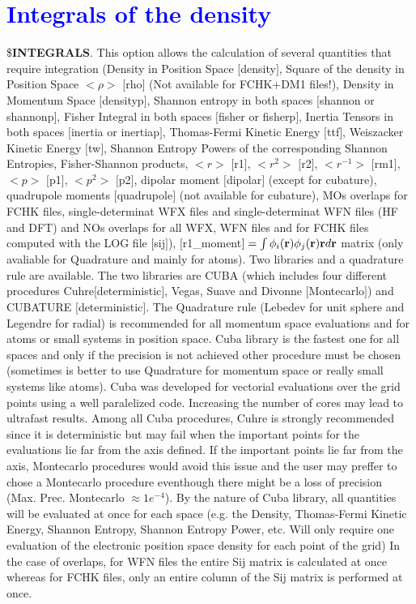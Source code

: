 \documentclass[10pt,a4paper]{article}
\newcommand{\tbl}[1]{{\textcolor{blue}{#1}}}
\begin{document}
\section{\tbl{\textbf{Integrals of the density}}}
\noindent \$\textbf{INTEGRALS}. This option allows the calculation of several quantities that require integration (Density in Position Space $[$density$]$, Square of the density in Position Space $<\rho>$ $[$rho$]$ (Not available for FCHK+DM1 files!), Density in Momentum Space $[$densityp$]$, Shannon entropy in both spaces $[$shannon or shannonp$]$, Fisher Integral in both spaces $[$fisher or fisherp$]$, Inertia Tensors in both spaces $[$inertia or inertiap$]$, Thomas-Fermi Kinetic Energy $[$ttf$]$, Weiszacker Kinetic Energy $[$tw$]$, Shannon Entropy Powers of the corresponding Shannon Entropies, Fisher-Shannon products, $<r>$ $[$r1$]$, $<r^2>$ $[$r2$]$, $<r^{-1}>$ $[$rm1$]$, $<p>$ $[$p1$]$, $<p^2>$ $[$p2$]$, dipolar moment $[$dipolar$]$ (except for cubature), quadrupole moments $[$quadrupole$]$ (not available for cubature), MOs overlaps for FCHK files, single-determinat WFX files and single-determinat WFN files (HF and DFT) and NOs overlaps for all WFX, WFN files and for FCHK files computed with the LOG file $[$sij$]$), $[$r1\_moment$]= \int \phi _i({\bf r}) \phi _j ({\bf r}) {\bf r} d {\bf r}$ matrix (only avaliable for Quadrature and mainly for atoms). Two libraries and a quadrature rule are available. The two libraries are CUBA (which includes four different procedures Cuhre$[$deterministic$]$, Vegas, Suave and Divonne $[$Montecarlo$]$) and CUBATURE $[$deterministic$]$.\newline
The Quadrature rule (Lebedev for unit sphere and Legendre for radial) is recommended for all momentum space evaluations and for atoms or small systems in position space.\newline
Cuba library is the fastest one for all spaces and only if the precision is not achieved other procedure must be chosen (sometimes is better to use Quadrature for momentum space or really small systems like atoms). Cuba was developed for vectorial evaluations over the grid points using a well paralelized code. Increasing the number of cores may lead to ultrafast results. Among all Cuba procedures, Cuhre is strongly recommended since it is deterministic but may fail when the important points for the evaluations lie far from the axis defined. If the important points lie far from the axis, Montecarlo procedures would avoid this issue and the user may preffer to chose a Montecarlo procedure eventhough there might be a loss of precision (Max. Prec. Montecarlo $\approx 1e^{-4}$). By the nature of Cuba library, all quantities will be evaluated at once for each space (e.g. the Density, Thomas-Fermi Kinetic Energy, Shannon Entropy, Shannon Entropy Power, etc. Will only require one evaluation of the electronic position space density for each point of the grid) In the case of overlaps, for WFN files the entire Sij matrix is calculated at once whereas for FCHK files, only an entire column of the Sij matrix is performed at once. \newline
\end{document}
